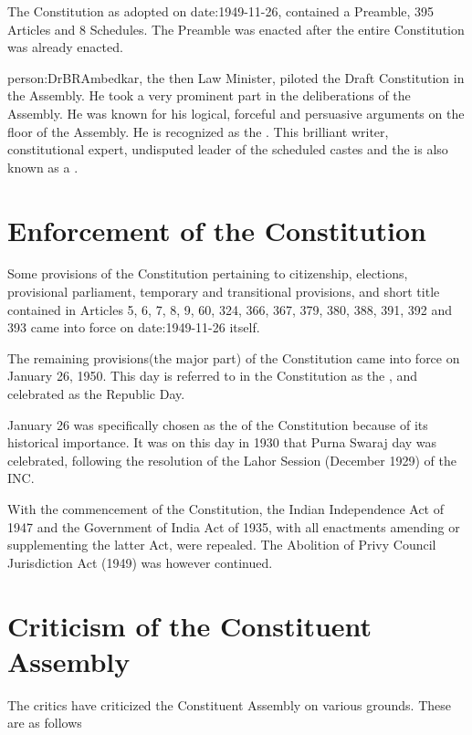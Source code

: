 { The Constitution as adopted on \gls{date:1949-11-26}, contained a Preamble, 395 Articles and 8 Schedules}. The Preamble was enacted after the entire Constitution was already enacted.

\gls{person:DrBRAmbedkar}, the then Law Minister, piloted the Draft Constitution in the Assembly. He took a very prominent part in the deliberations of the Assembly. He was known for his logical, forceful and persuasive arguments on the floor of the Assembly. He is recognized as the . This brilliant writer, constitutional expert, undisputed leader of the scheduled castes and the  is also known as a .

\section{Enforcement of the Constitution}

Some provisions of the Constitution pertaining to citizenship, elections, provisional parliament, temporary and transitional provisions, and short title contained in Articles 5, 6, 7, 8, 9, 60, 324, 366, 367, 379, 380, 388, 391, 392 and 393 came into force on \gls{date:1949-11-26} itself.

The remaining provisions(the major part) of the Constitution came into force on January 26, 1950. This day is referred to in the Constitution as the , and celebrated as the Republic Day.

January 26 was specifically chosen as the  of the Constitution because of its historical importance. It was on this day in 1930 that { Purna Swaraj} day was celebrated, following the resolution of the Lahor Session (December 1929) of the INC.

With the commencement of the Constitution, the Indian Independence Act of 1947 and the Government of India Act of 1935, with all enactments amending or supplementing the latter Act, were repealed. The Abolition of Privy Council Jurisdiction Act (1949) was however continued.

\section{Criticism of the Constituent Assembly}

The critics have criticized the Constituent Assembly on various grounds. These are as follows

